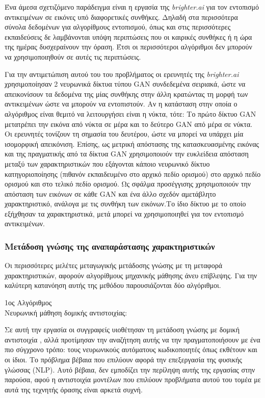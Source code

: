 Ένα άμεσα σχετιζόμενο παράδειγμα είναι η εργασία της \textit{brighter.ai} \cite{54} για τον εντοπισμό αντικειμένων σε εικόνες υπό διαφορετικές συνθήκες. Δηλαδή στα περισσότερα σύνολα δεδομένων για αλγορίθμους εντοπισμού, όπως και στις περισσότερες εκπαιδεύσεις δε λαμβάνονται υπόψη περιπτώσεις που οι καιρικές συνθήκες ή η ώρα της ημέρας δυσχεραίνουν την όραση. Έτσι οι περισσότεροι αλγόριθμοι δεν μπορούν να χρησιμοποιηθούν σε αυτές τις περιπτώσεις.

Για την αντιμετώπιση αυτού του του προβλήματος οι ερευνητές της \textit{brighter.ai} χρησιμοποίησαν 2 νευρωνικά δίκτυα τύπου GAN συνδεδεμένα σειριακά, ώστε να απεικονίσουν τα δεδομένα της μίας συνθήκης στην άλλη κρατώντας τη μορφή των αντικειμένων ώστε να μπορούν να εντοπιστούν. Αν η κατάσταση στην οποία ο αλγόριθμος είναι θεμιτό να λειτουργήσει είναι η νύκτα, τότε: Το πρώτο δίκτυο GAN μετατρέπει την εικόνα από νύκτα σε μέρα και το δεύτερο GAN από μέρα σε νύκτα. Οι ερευνητές τονίζουν τη σημασία του δευτέρου, ώστε να μπορεί να υπάρχει μία ισομορφική απεικόνιση. Επίσης, ως μετρική απόστασης της κατασκευασμένης εικόνας και της πραγματικής από τα δίκτυα GAN χρησιμοποιούν την ευκλείδεια απόσταση μεταξύ των χαρακτηριστικών που εξάγονται κάποιο νευρωνικό δίκτυο κατηγοριοποίησης (πιθανόν εκπαιδευμένο στο αρχικό πεδίο ορισμού) στο αρχικό πεδίο ορισμού και στο τελικό πεδίο ορισμού. Ως σφάλμα προσέγγισης χρησιμοποιούν την απόσταση των εικόνων σε κάθε GAN και ένα άλλο σχεδόν αμετάβλητο χαρακτηριστικό, ανάλογα με τις συνθήκη των εικόνων.Το ίδιο δίκτυο με το οποίο εξήχθησαν τα χαρακτηριστικά, μετά μπορεί να χρησιμοποιηθεί για τον εντοπισμό αντικειμένων.

\subsubsection{Μετάδοση γνώσης της αναπαράστασης χαρακτηριστικών}
Οι περισσότερες μελέτες μεταγωγικής μετάδοσης γνώσης  με τη μεταφορά χαρακτηριστικών, αφορούν αλγορίθμους μηχανικής μάθησης άνευ επίβλεψης. Για την καλύτερη κατανόηση αυτής της μεθόδου παρουσιάζονται δύο αλγόριθμοι.

1ος Αλγόριθμος \cite{52}\\
Νευρωνική μάθηση δομικής αντιστοιχίας:

Σε αυτή την εργασία οι συγγραφείς υιοθέτησαν τη μετάδοση γνώσης με δομική αντιστοιχία \cite{53}, αλλά προτίμησαν την αναζήτηση αυτής να την πραγματοποιήσουν με ένα πιο σύγχρονο τρόπο: τους νευρωνικούς αυτόματους κωδικοποιητές όπως εκθέτουν και οι ίδιοι. Το πρόβλημα βέβαια που επιλύουν αφορά την επεξεργασία της φυσικής γλώσσας (NLP). Αυτό βέβαια, δεν εμποδίζει την περίληψη αυτής της εργασίας στην παρούσα, αφού η αντιστοιχία μοντέλων που επιλύουν προβλήματα αυτού του τομέα με αυτά της τεχνητής όρασης είναι αρκετά συχνή. 

